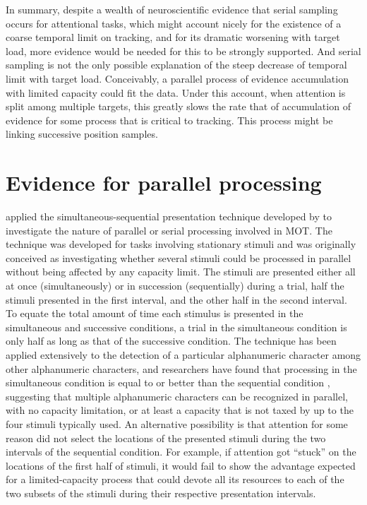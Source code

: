 \documentclass[
]{book}
\begin{document}
In summary, despite a wealth of neuroscientific evidence that serial sampling occurs for attentional tasks, which might account nicely for the existence of a coarse temporal limit on tracking, and for its dramatic worsening with target load, more evidence would be needed for this to be strongly supported. And serial sampling is not the only possible explanation of the steep decrease of temporal limit with target load. Conceivably, a parallel process of evidence accumulation with limited capacity could fit the data. Under this account, when attention is split among multiple targets, this greatly slows the rate that of accumulation of evidence for some process that is critical to tracking. This process might be linking successive position samples.

\hypertarget{evidence-for-parallel-processing}{%
\section{Evidence for parallel processing}\label{evidence-for-parallel-processing}}

\citet{howeDistinguishingParallelSerial2010} applied the simultaneous-sequential presentation technique developed by \citet{shiffrinVisualProcessingCapacity1972} to investigate the nature of parallel or serial processing involved in MOT. The technique was developed for tasks involving stationary stimuli and was originally conceived as investigating whether several stimuli could be processed in parallel without being affected by any capacity limit. The stimuli are presented either all at once (simultaneously) or in succession (sequentially) during a trial, half the stimuli presented in the first interval, and the other half in the second interval. To equate the total amount of time each stimulus is presented in the simultaneous and successive conditions, a trial in the simultaneous condition is only half as long as that of the successive condition. The technique has been applied extensively to the detection of a particular alphanumeric character among other alphanumeric characters, and researchers have found that processing in the simultaneous condition is equal to or better than the sequential condition \citep{shiffrinVisualProcessingCapacity1972, hungSimultaneousBetterSequential1995}, suggesting that multiple alphanumeric characters can be recognized in parallel, with no capacity limitation, or at least a capacity that is not taxed by up to the four stimuli typically used. An alternative possibility is that attention for some reason did not select the locations of the presented stimuli during the two intervals of the sequential condition. For example, if attention got ``stuck'' on the locations of the first half of stimuli, it would fail to show the advantage expected for a limited-capacity process that could devote all its resources to each of the two subsets of the stimuli during their respective presentation intervals.
\end{document}
